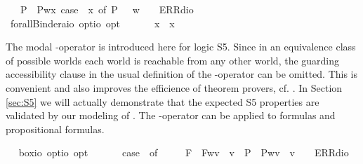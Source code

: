 \begin{isabellebody}
\ \ {\isacharbar}\ P{\isacharparenleft}{\isacharunderscore}{\isacharparenright}\ {\isasymRightarrow}\ P{\isacharparenleft}{\isasymlambda}w{\isachardot}{\isasymforall}x{\isachardot}\ case\ {\isacharparenleft}{\isasymPhi}\ x{\isacharparenright}\ of\ P{\isacharparenleft}{\isasympsi}{\isacharparenright}\ {\isasymRightarrow}\ {\isasympsi}\ w{\isacharparenright}\ {\isacharbar}\ {\isacharunderscore}\ {\isasymRightarrow}\ ERR{\isacharparenleft}dio{\isacharparenright}{\isachardoublequoteclose}\isanewline
\ \isamarkupfalse%
\ forallBinder{\isacharcolon}{\isacharcolon}{\isachardoublequoteopen}{\isacharparenleft}{\isacharprime}a{\isasymRightarrow}io\ opt{\isacharparenright}{\isasymRightarrow}io\ opt{\isachardoublequoteclose}\ {\isacharparenleft}\ {\isachardoublequoteopen}\isactrlbold {\isasymforall}{\isachardoublequoteclose}\ {\isacharbrackleft}{}{\isacharbrackright}\ {}{\isacharparenright}\ \ \ {\isachardoublequoteopen}\isactrlbold {\isasymforall}x{\isachardot}\ {\isasymphi}\ x\ {\isasymequiv}\ \isactrlbold {\isasymforall}{\isasymphi}{\isachardoublequoteclose}%
\begin{isamarkuptext}%
The modal \isa{\isactrlbold {\isasymbox}}-operator is introduced here for logic S5. Since in an equivalence class
  of possible worlds each world is reachable from any other world, the guarding accessibility clause
  in the usual definition of the \isa{\isactrlbold {\isasymbox}}-operator can be omitted. This is convenient and also
  improves the efficience of theorem provers, cf. \cite{C55}.  
  In Section \ref{sec:S5} we will actually demonstrate that the expected S5 properties
  are validated by our modeling of \isa{\isactrlbold {\isasymbox}}.  The \isa{\isactrlbold {\isasymbox}}-operator can be applied to 
  formulas  and propositional formulas.%
\end{isamarkuptext}%
\isamarkuptrue%
\ \isamarkupfalse%
\ box{\isacharcolon}{\isacharcolon}{\isachardoublequoteopen}io\ opt{\isasymRightarrow}io\ opt{\isachardoublequoteclose}\ {\isacharparenleft}{\isachardoublequoteopen}\isactrlbold {\isasymbox}{\isacharunderscore}{\isachardoublequoteclose}\ {\isacharbrackleft}{}{}{\isacharbrackright}\ {}{}{\isacharparenright}\ \ {\isachardoublequoteopen}\isactrlbold {\isasymbox}{\isasymphi}\ {\isasymequiv}\ case\ {\isasymphi}\ of\ \isanewline
\ \ \ \ F{\isacharparenleft}{\isasympsi}{\isacharparenright}\ {\isasymRightarrow}\ F{\isacharparenleft}{\isasymlambda}w{\isachardot}{\isasymforall}v{\isachardot}\ {\isasympsi}\ v{\isacharparenright}\ {\isacharbar}\ P{\isacharparenleft}{\isasympsi}{\isacharparenright}\ {\isasymRightarrow}\ P{\isacharparenleft}{\isasymlambda}w{\isachardot}{\isasymforall}v{\isachardot}\ {\isasympsi}\ v{\isacharparenright}\ {\isacharbar}\ {\isacharunderscore}\ {\isasymRightarrow}\ ERR{\isacharparenleft}dio{\isacharparenright}{\isachardoublequoteclose}%

\end{isabellebody}
